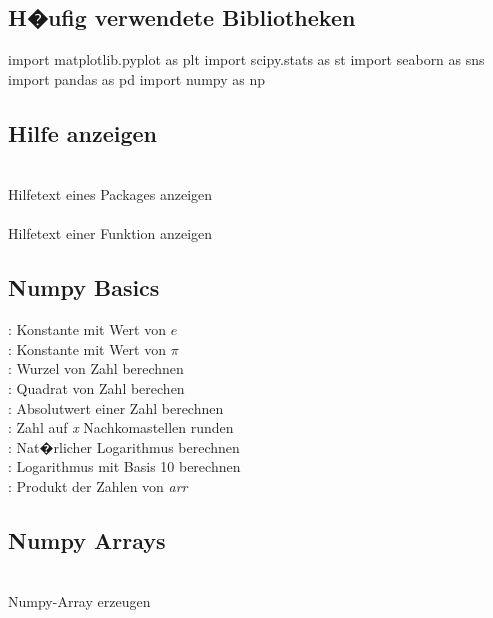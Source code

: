 \documentclass{article}
\begin{document}
\begin{multicols*}{3}

\subsection*{H�ufig verwendete Bibliotheken}
\begin{python}
import matplotlib.pyplot as plt
import scipy.stats as st
import seaborn as sns
import pandas as pd
import numpy as np
\end{python}

\subsection*{Hilfe anzeigen}
 \\
Hilfetext eines Packages anzeigen \\

 \\
Hilfetext einer Funktion anzeigen 

\subsection*{Numpy Basics}
: Konstante mit Wert von $e$ \\
:  Konstante mit Wert von $\pi$ \\
: Wurzel von Zahl berechnen \\
: Quadrat von Zahl berechen \\
: Absolutwert einer Zahl berechnen \\
: Zahl auf \textit{x} Nachkomastellen runden \\
: Nat�rlicher Logarithmus berechnen \\
: Logarithmus mit Basis 10 berechnen \\
: Produkt der Zahlen von \textit{arr}

\subsection*{Numpy Arrays}
 \\
Numpy-Array erzeugen \\


\end{multicols*}
\end{document}
